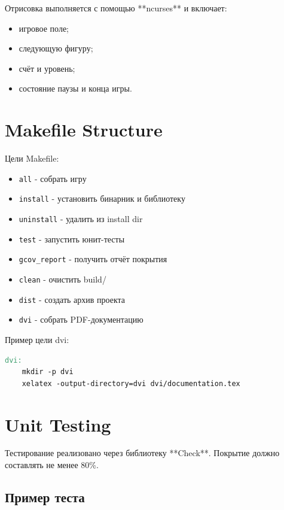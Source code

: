 \documentclass[12pt,a4paper]{article}
\begin{document}
Отрисовка выполняется с помощью **ncurses** и включает:

\begin{itemize}
    \item игровое поле;
    \item следующую фигуру;
    \item счёт и уровень;
    \item состояние паузы и конца игры.
\end{itemize}

\section{Makefile Structure}

Цели Makefile:

\begin{itemize}
    \item \verb|all| - собрать игру
    \item \verb|install| - установить бинарник и библиотеку
    \item \verb|uninstall| - удалить из install dir
    \item \verb|test| - запустить юнит-тесты
    \item \verb|gcov_report| - получить отчёт покрытия
    \item \verb|clean| - очистить build/
    \item \verb|dist| - создать архив проекта
    \item \verb|dvi| - собрать PDF-документацию
\end{itemize}

Пример цели dvi:

\begin{lstlisting}[language=make]
dvi:
    mkdir -p dvi
    xelatex -output-directory=dvi dvi/documentation.tex
\end{lstlisting}

\section{Unit Testing}

Тестирование реализовано через библиотеку **Check**.
Покрытие должно составлять не менее 80\%.

\subsection{Пример теста}
\end{document}
